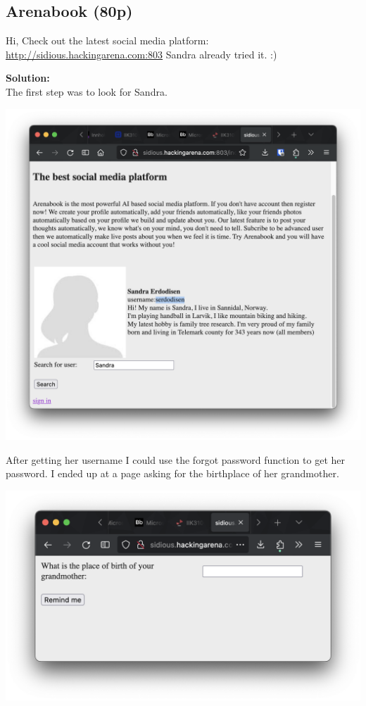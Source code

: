 \newpage
\subsection{Arenabook (80p)}
Hi, Check out the latest social media platform:
\url{http://sidious.hackingarena.com:803}
Sandra already tried it. :)

\textbf{Solution:}\\
The first step was to look for Sandra.

\begin{center}
    \includegraphics[width=15cm]{img/Web hacking/Arenabook/Skjermbilde 2023-10-26 kl. 14.49.43.png}
\end{center}

After getting her username I could use the forgot password function to get her password. I ended up at a page asking for the birthplace of her grandmother.

\begin{center}
    \includegraphics[width=14cm]{img/Web hacking/Arenabook/Skjermbilde 2023-10-26 kl. 14.50.02.png}
\end{center}

